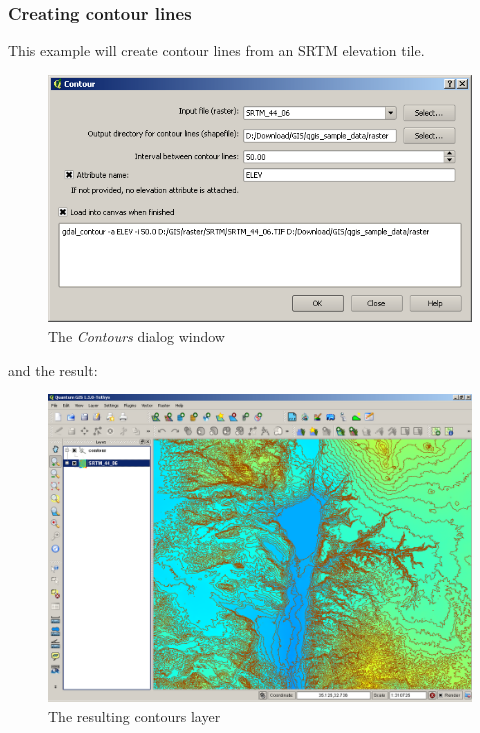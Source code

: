 {\subsubsection{Creating contour lines}
This example will create contour lines from an SRTM elevation tile.
\begin{figure}[ht]
   \centering
   \caption{The \emph{Contours} dialog window \nixcaption}\label{gdal_contour}
   \includegraphics[clip=true, width=12cm]{plugins_gdaltools_images/gdal_contour}
\end{figure}
and the result:
\begin{figure}[ht]
   \centering
   \caption{The resulting contours layer \nixcaption}\label{gdal_contour}
   \includegraphics[clip=true, width=12cm]{plugins_gdaltools_images/qgis_contours}
\end{figure}

}
